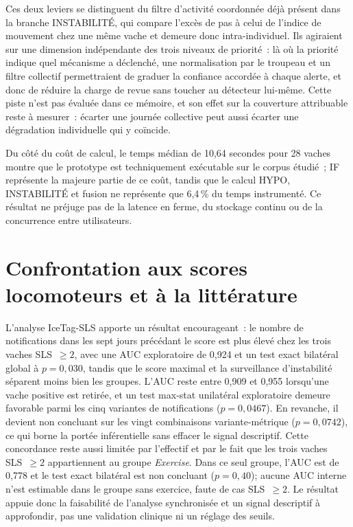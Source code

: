 Ces deux leviers se distinguent du filtre d'activité coordonnée déjà présent dans la branche
INSTABILITÉ, qui compare l'excès de pas à celui de l'indice de mouvement chez une même vache
et demeure donc intra-individuel. Ils agiraient sur une dimension indépendante des trois niveaux de
priorité~: là où la priorité indique quel mécanisme a déclenché, une normalisation par le
troupeau et un filtre collectif permettraient de graduer la confiance accordée à chaque
alerte, et donc de réduire la charge de revue sans toucher au détecteur lui-même. Cette piste
n'est pas évaluée dans ce mémoire, et son effet sur la couverture attribuable reste à mesurer~: écarter
une journée collective peut aussi écarter une dégradation individuelle qui y coïncide.

Du côté du coût de calcul, le temps médian de 10,64 secondes pour
28 vaches montre que le prototype est techniquement exécutable sur le corpus étudié~;
IF représente la majeure partie de ce coût, tandis que le calcul
HYPO, INSTABILITÉ et fusion ne représente que 6,4\,\% du temps instrumenté. Ce résultat ne
préjuge pas de la latence en ferme, du stockage continu ou de la concurrence entre
utilisateurs.

\section{Confrontation aux scores locomoteurs et à la littérature}
L'analyse IceTag-SLS apporte un résultat encourageant~: le nombre de notifications dans les
sept jours précédant le score est plus élevé chez les trois vaches SLS~$\geq2$, avec une AUC
exploratoire de 0,924 et un test exact bilatéral global à $p=0{,}030$, tandis que le score
maximal et la surveillance d'instabilité séparent moins bien les groupes. L'AUC reste entre
0,909 et 0,955 lorsqu'une vache positive est retirée, et un test max-stat unilatéral
exploratoire demeure favorable parmi les cinq variantes de notifications ($p=0{,}0467$). En revanche, il devient
non concluant sur les vingt combinaisons variante-métrique ($p=0{,}0742$), ce qui borne la
portée inférentielle sans effacer le signal descriptif. Cette concordance
reste aussi limitée par l'effectif et par le fait que les trois vaches SLS~$\geq2$ appartiennent
au groupe \textit{Exercise}. Dans ce seul groupe, l'AUC est de 0,778 et le test exact
bilatéral est non concluant ($p=0{,}40$); aucune AUC interne n'est estimable dans le groupe
sans exercice, faute de cas SLS~$\geq2$. Le résultat appuie donc la faisabilité de l'analyse
synchronisée et un signal descriptif à approfondir, pas une validation clinique ni un
réglage des seuils.

